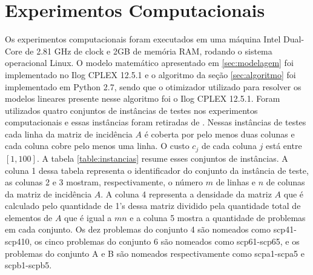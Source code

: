\section{Experimentos Computacionais}\label{sec:experimentos} 
Os experimentos computacionais foram executados em uma máquina Intel Dual-Core de 2.81 GHz de clock e
2GB de memória RAM, rodando o sistema operacional Linux. O modelo matemático apresentado em \ref{sec:modelagem} foi implementado
no Ilog CPLEX 12.5.1 e o algoritmo da seção \ref{sec:algoritmo} foi implementado
em Python 2.7, sendo que o otimizador utilizado para resolver os modelos lineares presente nesse algoritmo foi o Ilog CPLEX 12.5.1.
Foram utilizados quatro conjuntos de instâncias de testes nos experimentos computacionais e essas instâncias foram retiradas de \cite{Beasley90}.
Nessas instâncias de testes cada linha da matriz de incidência $A$ é coberta por pelo menos duas colunas e cada coluna cobre pelo menos uma linha. O
custo $c_j$ de cada coluna $j$ está entre $[1,100]$. A tabela \ref{table:instancias} resume esses conjuntos de instâncias. A coluna 1 dessa tabela 
representa o identificador do conjunto da instância de teste,
as colunas 2 e 3 mostram, respectivamente, o número $m$ de linhas e $n$ de colunas da matriz de incidência $A$. A coluna 4 representa
a densidade da matriz $A$ que é calculado pelo quantidade de 1's dessa matriz dividido pela quantidade total de elementos de $A$ que é igual a 
$mn$ e a coluna 5 mostra a quantidade de problemas em cada conjunto. Os dez problemas do conjunto 4 são nomeados como scp41-scp410, os cinco
problemas do conjunto 6 são nomeados como scp61-scp65, e os problemas do conjunto A e B são nomeados respectivamente como scpa1-scpa5
e scpb1-scpb5.

